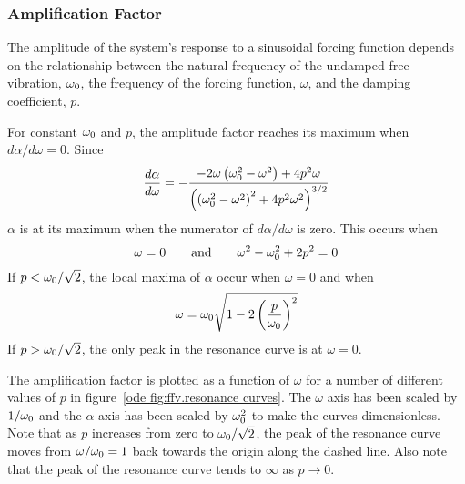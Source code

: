 \subsubsection{Amplification Factor}

The amplitude of the system's response to a sinusoidal forcing function
depends on the relationship between the natural frequency of the undamped
free vibration, $\omega_0$, the frequency of the forcing function, $\omega$, and
the damping coefficient, $p$.

For constant $\omega_0$ and $p$, the amplitude factor reaches its maximum when
$d\alpha/d\omega=0$.  Since
$$\frac{d\alpha}{d\omega}=-\frac{-2\omega\left(\omega_0^2-\omega^2\right)
+4p^2\omega}{\left(\left(\omega_0^2-\omega^2\right)^2+4p^2\omega^2\right)^{3/2}}$$
$\alpha$ is at its maximum when the numerator of $d\alpha/d\omega$ is zero.
This occurs when 
$$\omega=0\qquad\mbox{and}\qquad \omega^2-\omega_0^2+2p^2=0$$
If $p<\omega_0/\sqrt{2}$, the local maxima of $\alpha$ occur when $\omega=0$
and when 
$$\omega=\omega_0\sqrt{1-2\left(\frac{p}{\omega_0}\right)^2}$$
If $p>\omega_0/\sqrt{2}$, the only peak in the resonance curve is at $\omega=0$.

The amplification factor is plotted as a function of $\omega$ for a number
of different values of $p$ in figure~\ref{ode fig:ffv.resonance curves}.
The $\omega$ axis has been scaled by $1/\omega_0$ and the $\alpha$ axis has been
scaled by $\omega_0^2$ to make the curves dimensionless.  Note that as $p$
increases from zero to $\omega_0/\sqrt{2}$, the peak of the resonance curve 
moves from $\omega/\omega_0=1$ back towards the origin along the dashed line.  
Also note that the peak of the resonance curve tends to $\infty$ as 
$p\rightarrow 0$.


